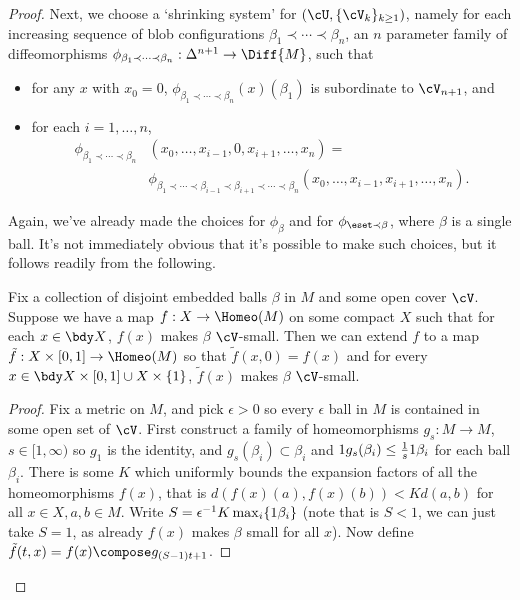 \begin{proof}
Next, we choose a `shrinking system' for $\left(\cU,\{\cV_k\}_{k \geq 1}\right)$, namely for each increasing sequence of blob configurations
$\beta_1 \prec \cdots \prec \beta_n$, an $n$ parameter family of diffeomorphisms
$\phi_{\beta_1 \prec \cdots \prec \beta_n} : \Delta^{n+1} \to \Diff{M}$, such that
\begin{itemize}
\item for any $x$ with $x_0 = 0$, $\phi_{\beta_1 \prec \cdots \prec \beta_n}(x)(\beta_1)$ is subordinate to $\cV_{n+1}$, and
\item for each $i = 1, \ldots, n$,
\begin{align*}
\phi_{\beta_1 \prec \cdots \prec \beta_n}&(x_0, \ldots, x_{i-1},0,x_{i+1},\ldots,x_n) = \\ &\phi_{\beta_1 \prec \cdots \prec \beta_{i-1} \prec \beta_{i+1} \prec \cdots \prec \beta_n}(x_0,\ldots, x_{i-1},x_{i+1},\ldots,x_n).
\end{align*}
\end{itemize}
Again, we've already made the choices for $\phi_{\beta}$ and for $\phi_{\eset \prec \beta}$, where $\beta$ is a single ball. It's not immediately obvious that it's possible to make such choices, but it follows readily from the following.

\begin{lem}
\label{lem:extend-small-homeomorphisms}
Fix a collection of disjoint embedded balls $\beta$ in $M$ and some open cover $\cV$. Suppose we have a map $f :  X \to \Homeo(M)$ on some compact $X$ such that for each $x \in \bdy X$, $f(x)$ makes $\beta$ $\cV$-small. Then we can extend $f$ to a map $\tilde{f} : X \times [0,1] \to \Homeo(M)$ so that $\tilde{f}(x,0) = f(x)$ and for every $x \in \bdy X \times [0,1] \cup X \times \{1\}$, $\tilde{f}(x)$ makes $\beta$ $\cV$-small.
\end{lem}
\begin{proof}
Fix a metric on $M$, and pick $\epsilon > 0$ so every $\epsilon$ ball in $M$ is contained in some open set of $\cV$. First construct a family of homeomorphisms $g_s : M \to M$, $s \in [1,\infty)$ so $g_1$ is the identity, and $g_s(\beta_i) \subset \beta_i$ and $1 g_s(\beta_i) \leq \frac{1}{s} 1 \beta_i$ for each ball $\beta_i$. 
There is some $K$ which uniformly bounds the expansion factors of all the homeomorphisms $f(x)$, that is $d(f(x)(a), f(x)(b)) < K d(a,b)$ for all $x \in X, a,b \in M$. Write $S=\epsilon^{-1} K \max_i \{1 \beta_i\}$ (note that is $S<1$, we can just take $S=1$, as already $f(x)$ makes $\beta$ small for all $x$). Now define $\tilde{f}(t, x) = f(x) \compose g_{(S-1)t+1}$.


\end{proof}
\end{proof}

